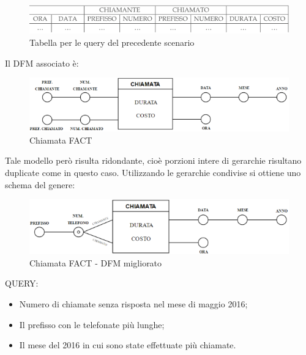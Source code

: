 \begin{center}
\begin{figure}[H]
\centering
\includegraphics[scale=1]{figures/chiamante_chiamato_table.png}
\caption{Tabella per le query del precedente scenario}
\end{figure}
\end{center}

Il DFM associato è: 

\begin{center}
\begin{figure}[H]
\centering
\includegraphics[scale=1]{figures/chiamata.png}
\caption{Chiamata FACT}
\end{figure}
\end{center}

Tale modello però risulta ridondante, cioè porzioni intere di gerarchie risultano duplicate come in questo caso. Utilizzando le gerarchie condivise si ottiene uno schema del genere:

\begin{center}
\begin{figure}[H]
\centering
\includegraphics[scale=1]{figures/enhanced_chiamata.png}
\caption{Chiamata FACT - DFM migliorato}
\end{figure}
\end{center}

QUERY:

\begin{itemize}
\item Numero di chiamate senza risposta nel mese di maggio 2016;
\item Il prefisso con le telefonate più lunghe;
\item Il mese del 2016 in cui sono state effettuate più chiamate. 
\end{itemize}



